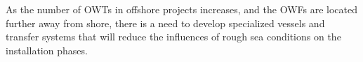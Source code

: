 As the number of OWTs in offshore projects increases, and the OWFs are located further away from shore, there is a need to develop specialized vessels and transfer systems that will reduce the influences of rough sea conditions on the installation phases.



